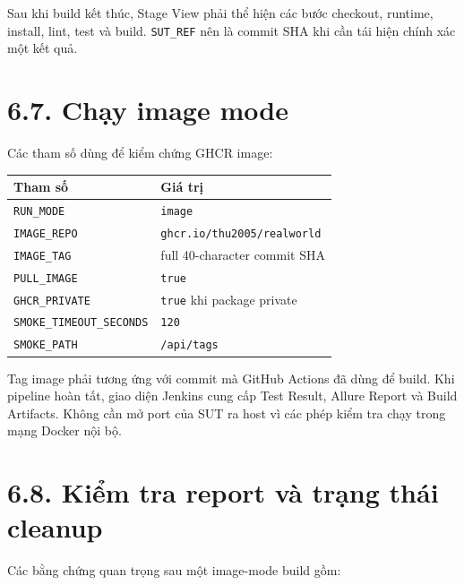 \documentclass[
  vietnamese,
  12pt,
  a4paper,
  oneside]{report}
\begin{document}
Sau khi build kết thúc, Stage View phải thể hiện các bước checkout,
runtime, install, lint, test và build. \texttt{SUT\_REF} nên là commit
SHA khi cần tái hiện chính xác một kết quả.

\section{6.7. Chạy image mode}\label{67-chux1ea1y-image-mode}

Các tham số dùng để kiểm chứng GHCR image:

\begin{longtable}[]{@{}
  >{\raggedright\arraybackslash}p{}
  >{\raggedright\arraybackslash}p{}@{}}
\toprule\noalign{}
\begin{minipage}[b]{\linewidth}\raggedright
Tham số
\end{minipage} & \begin{minipage}[b]{\linewidth}\raggedright
Giá trị
\end{minipage} \\
\midrule\noalign{}
\endhead
\bottomrule\noalign{}
\endlastfoot
\texttt{RUN\_MODE} & \texttt{image} \\
\texttt{IMAGE\_REPO} & \texttt{ghcr.io/thu2005/realworld} \\
\texttt{IMAGE\_TAG} & full 40-character commit SHA \\
\texttt{PULL\_IMAGE} & \texttt{true} \\
\texttt{GHCR\_PRIVATE} & \texttt{true} khi package private \\
\texttt{SMOKE\_TIMEOUT\_SECONDS} & \texttt{120} \\
\texttt{SMOKE\_PATH} & \texttt{/api/tags} \\
\end{longtable}

Tag image phải tương ứng với commit mà GitHub Actions đã dùng để build.
Khi pipeline hoàn tất, giao diện Jenkins cung cấp Test Result, Allure
Report và Build Artifacts. Không cần mở port của SUT ra host vì các phép
kiểm tra chạy trong mạng Docker nội bộ.

\section{6.8. Kiểm tra report và trạng thái
cleanup}\label{68-kiux1ec3m-tra-report-vuxe0-trux1ea1ng-thuxe1i-cleanup}

Các bằng chứng quan trọng sau một image-mode build gồm:
\end{document}
